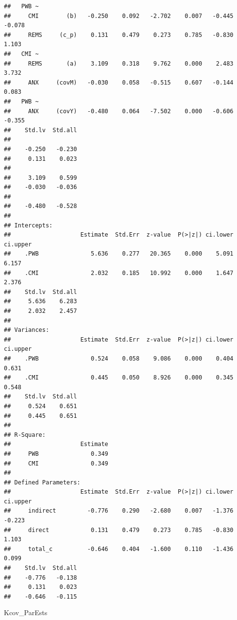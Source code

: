 \documentclass[
  11pt,
]{book}
\newenvironment{Shaded}{\begin{snugshade}}{\end{snugshade}}
\newcommand{\NormalTok}[1]{#1}
\begin{document}
\begin{verbatim}
##   PWB ~                                                                 
##     CMI        (b)   -0.250    0.092   -2.702    0.007   -0.445   -0.078
##     REMS     (c_p)    0.131    0.479    0.273    0.785   -0.830    1.103
##   CMI ~                                                                 
##     REMS       (a)    3.109    0.318    9.762    0.000    2.483    3.732
##     ANX     (covM)   -0.030    0.058   -0.515    0.607   -0.144    0.083
##   PWB ~                                                                 
##     ANX     (covY)   -0.480    0.064   -7.502    0.000   -0.606   -0.355
##    Std.lv  Std.all
##                   
##    -0.250   -0.230
##     0.131    0.023
##                   
##     3.109    0.599
##    -0.030   -0.036
##                   
##    -0.480   -0.528
## 
## Intercepts:
##                    Estimate  Std.Err  z-value  P(>|z|) ci.lower ci.upper
##    .PWB               5.636    0.277   20.365    0.000    5.091    6.157
##    .CMI               2.032    0.185   10.992    0.000    1.647    2.376
##    Std.lv  Std.all
##     5.636    6.283
##     2.032    2.457
## 
## Variances:
##                    Estimate  Std.Err  z-value  P(>|z|) ci.lower ci.upper
##    .PWB               0.524    0.058    9.086    0.000    0.404    0.631
##    .CMI               0.445    0.050    8.926    0.000    0.345    0.548
##    Std.lv  Std.all
##     0.524    0.651
##     0.445    0.651
## 
## R-Square:
##                    Estimate
##     PWB               0.349
##     CMI               0.349
## 
## Defined Parameters:
##                    Estimate  Std.Err  z-value  P(>|z|) ci.lower ci.upper
##     indirect         -0.776    0.290   -2.680    0.007   -1.376   -0.223
##     direct            0.131    0.479    0.273    0.785   -0.830    1.103
##     total_c          -0.646    0.404   -1.600    0.110   -1.436    0.099
##    Std.lv  Std.all
##    -0.776   -0.138
##     0.131    0.023
##    -0.646   -0.115
\end{verbatim}

\begin{Shaded}
\begin{Highlighting}[]
\NormalTok{Kcov\_ParEsts}
\end{Highlighting}
\end{Shaded}
\end{document}
